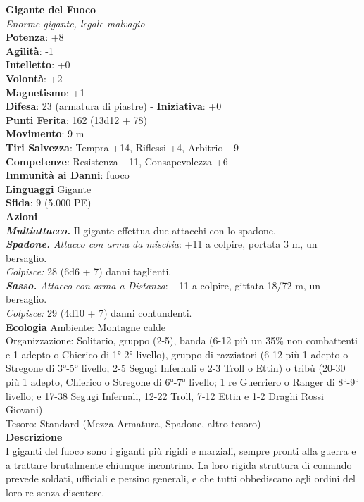 \begin{multicols}{2}
\medskip\textbf{Gigante del Fuoco}\\
\emph{Enorme gigante, legale malvagio}\\
\textbf{Potenza}: +8\\
\textbf{Agilità}: -1\\
\textbf{Intelletto}: +0\\
\textbf{Volontà}: +2\\
\textbf{Magnetismo}: +1\\
\textbf{Difesa}: 23 (armatura di piastre) - \textbf{Iniziativa}: +0\\
\textbf{Punti Ferita}: 162 (13d12 + 78)\\
\textbf{Movimento}: 9 m\\
\textbf{Tiri Salvezza}: Tempra +14, Riflessi +4, Arbitrio +9\\
\textbf{Competenze}: Resistenza +11, Consapevolezza +6\\
\textbf{Immunità ai Danni}: fuoco\\
\textbf{Linguaggi} Gigante\\
\textbf{Sfida}: 9 (5.000 PE)\smallskip\\
\smallskip\textbf{Azioni}\\
\emph{\textbf{Multiattacco.}} Il gigante effettua due attacchi con lo spadone.\\
\emph{\textbf{Spadone.} Attacco con arma da mischia}: +11 a colpire, portata 3 m, un bersaglio.\\
\emph{Colpisce:} 28 (6d6 + 7) danni taglienti.\\
\emph{\textbf{Sasso.} Attacco con arma a Distanza}: +11 a colpire, gittata 18/72 m, un bersaglio.\\
\emph{Colpisce:} 29 (4d10 + 7) danni contundenti. \\
\textbf{Ecologia}
Ambiente: Montagne calde\\
Organizzazione: Solitario, gruppo (2-5), banda (6-12 più un 35\% non combattenti e 1 adepto o Chierico di 1°-2° livello), gruppo di razziatori (6-12 più 1 adepto o Stregone di 3°-5° livello, 2-5 Segugi Infernali e 2-3 Troll o Ettin) o tribù (20-30 più 1 adepto, Chierico o Stregone di 6°-7° livello; 1 re Guerriero o Ranger di 8°-9° livello; e 17-38 Segugi Infernali, 12-22 Troll, 7-12 Ettin e 1-2 Draghi Rossi Giovani)\\
Tesoro: Standard (Mezza Armatura, Spadone, altro tesoro)\\
\textbf{Descrizione}\\
I giganti del fuoco sono i giganti più rigidi e marziali, sempre pronti alla guerra e a trattare brutalmente chiunque incontrino. La loro rigida struttura di comando prevede soldati, ufficiali e persino generali, e che tutti obbediscano agli ordini del loro re senza discutere.\\


\end{multicols}
